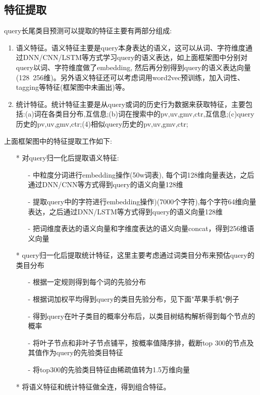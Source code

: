 \subsection{特征提取}
query长尾类目预测可以提取的特征主要有两部分组成:
\begin{enumerate}
\item 语义特征。语义特征主要是query本身表达的语义，这可以从词、字符维度通过DNN/CNN/LSTM等方式学习query的语义表达，如上面框架图中分别对query以词、字符维度做了embedding, 然后再分别得到query的语义表达向量(128~256维)。另外语义特征还可以考虑词用word2vec预训练，加入词性、tagging等特征(框架图中未画出)等。
\item 统计特征。统计特征主要是从query或词的历史行为数据来获取特征，主要包括:(a)词在各类目分布,互信息;(b)词在搜索中的pv,uv,gmv,ctr,互信息;(c)query历史的pv,uv,gmv,ctr;(4)相似query历史的pv,uv,gmv,ctr;
\end{enumerate}
上面框架图中的特征提取工作如下:
\begin{itemize}
\item[*] 对query归一化后提取语义特征:
\begin{itemize}
\item[-] 中粒度分词进行embedding操作(50w词表), 每个词128维向量表达，之后通过DNN/CNN等方式得到query的语义向量128维
\item[-] 提取query中的字符进行embedding操作)(7000个字符),每个字符64维向量表达，之后通过DNN/LSTM等方式得到query的语义向量128维
\item[-] 把词维度表达的语义向量和字维度表达的语义向量concat，得到256维语义向量
\end{itemize}
\item[*] query归一化后提取统计特征，这里主要考虑通过词类目分布来预估query的类目分布
\begin{itemize}
\item[-] 根据一定规则得到每个词的先验分布
\item[-] 根据词加权平均得到query的类目先验分布，见下面"苹果手机"例子
\item[-] 得到query在叶子类目的概率分布后，以类目树结构解析得到每个节点的概率
\item[-] 将叶子节点和非叶子节点铺平，按概率值降序排，截断top 300的节点及其值作为query的先验类目特征
\item[-]将top300的先验类目特征由稀疏值转为1.5万维向量
\end{itemize}
\item[*] 将语义特征和统计特征做全连，得到组合特征。
\end{itemize}

